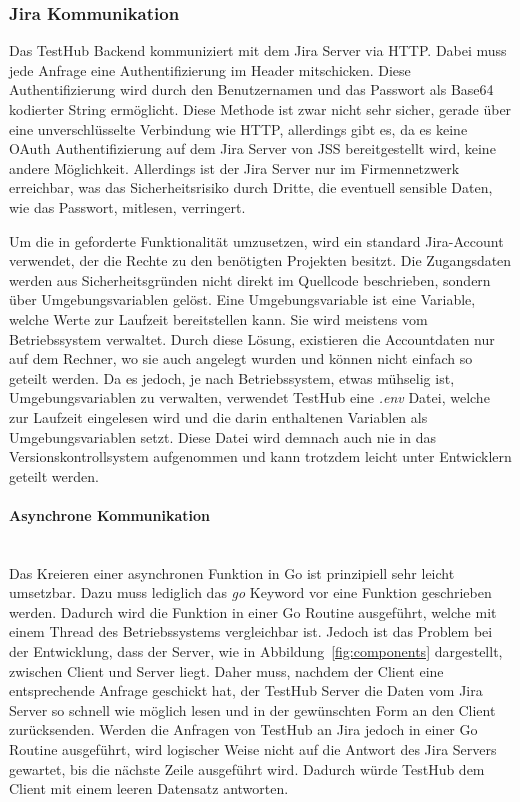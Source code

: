 \subsubsection{Jira Kommunikation}
Das TestHub Backend kommuniziert mit dem Jira Server via \gls{HTTP}. Dabei muss 
jede Anfrage eine Authentifizierung im Header mitschicken. Diese Authentifizierung
wird durch den Benutzernamen und das Passwort als Base64 kodierter String ermöglicht.
Diese Methode ist zwar nicht sehr sicher, gerade über eine unverschlüsselte
Verbindung wie \gls{HTTP}, allerdings gibt es, da es keine OAuth Authentifizierung auf
dem Jira Server von \gls{JSS} bereitgestellt wird, keine andere Möglichkeit.
Allerdings ist der Jira Server nur im Firmennetzwerk erreichbar, was das Sicherheitsrisiko
durch Dritte, die eventuell sensible Daten, wie das Passwort, mitlesen, verringert.

Um die in  geforderte Funktionalität umzusetzen, 
wird ein standard Jira-Account verwendet, der die Rechte zu den benötigten Projekten besitzt.
Die Zugangsdaten werden aus Sicherheitsgründen nicht direkt im Quellcode beschrieben, 
sondern über Umgebungsvariablen gelöst. Eine Umgebungsvariable ist eine Variable, 
welche Werte zur Laufzeit bereitstellen kann. Sie wird meistens vom Betriebssystem verwaltet.
Durch diese Lösung, existieren die Accountdaten nur auf dem Rechner, wo sie auch
angelegt wurden und können nicht einfach so geteilt werden.
Da es jedoch, je nach Betriebssystem, etwas mühselig ist, Umgebungsvariablen zu
verwalten, verwendet TestHub eine \textit{.env} Datei, welche zur Laufzeit eingelesen
wird und die darin enthaltenen Variablen als Umgebungsvariablen setzt. Diese Datei
wird demnach auch nie in das Versionskontrollsystem aufgenommen und kann trotzdem
leicht unter Entwicklern geteilt werden.

\paragraph{Asynchrone Kommunikation}\hfill\\
Das Kreieren einer asynchronen Funktion in Go ist prinzipiell sehr leicht umsetzbar.
Dazu muss lediglich das \textit{go} Keyword vor eine Funktion geschrieben werden.
Dadurch wird die Funktion in einer Go Routine ausgeführt, welche mit einem Thread 
des Betriebssystems vergleichbar ist. 
Jedoch ist das Problem bei der Entwicklung, dass der Server, wie in Abbildung~\ref{fig:components}
dargestellt, zwischen Client und Server liegt. Daher muss, nachdem der Client 
eine entsprechende Anfrage geschickt hat, der TestHub Server die Daten vom Jira 
Server so schnell wie möglich lesen und in der gewünschten Form an den Client zurücksenden.
Werden die Anfragen von TestHub an Jira jedoch in einer Go Routine ausgeführt, wird logischer Weise nicht
auf die Antwort des Jira Servers gewartet, bis die nächste Zeile ausgeführt wird.
Dadurch würde TestHub dem Client mit einem leeren Datensatz antworten.


